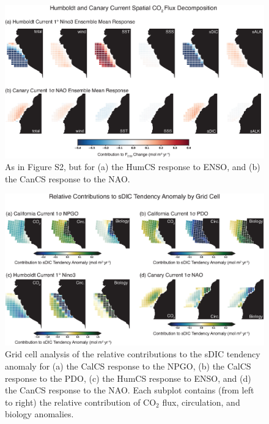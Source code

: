 \documentclass[]{article}
\begin{document}
\newpage
\begin{figure}[h]
	\centering
	\includegraphics[width=39pc]{figs/S2_CanCS_HumCS_CO2_decomposition.eps}
	\caption{As in Figure S2, but for (a) the HumCS response to ENSO, and (b) the CanCS response to the NAO.}
\end{figure}

\newpage
\begin{figure}[h]
	\centering
	\includegraphics[width=39pc]{figs/S7_sDIC_overhead.eps}
	\caption{Grid cell analysis of the relative contributions to the sDIC tendency anomaly for (a) the CalCS response to the NPGO, (b) the CalCS response to the PDO, (c) the HumCS response to ENSO, and (d) the CanCS response to the NAO. Each subplot contains (from left to right) the relative contribution of CO$_{2}$ flux, circulation, and biology anomalies.}
\end{figure}
\end{document}
